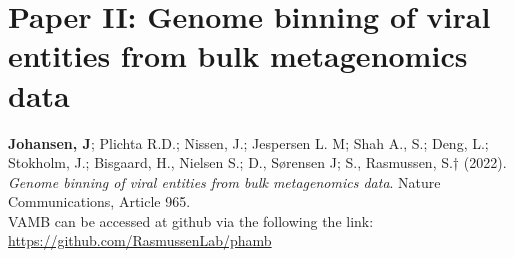 \section{Paper II: Genome binning of viral entities from bulk metagenomics data}

\textbf{Johansen, J}; Plichta R.D.; Nissen, J.; Jespersen L. M; Shah A., S.; Deng, L.; Stokholm, J.; Bisgaard, H., Nielsen S.; D., Sørensen J; S., Rasmussen, S.† (2022). \textit{Genome binning of viral entities from bulk metagenomics data}. Nature Communications, Article 965.\\

\noindent
VAMB can be accessed at github via the following the link: \url{https://github.com/RasmussenLab/phamb}


